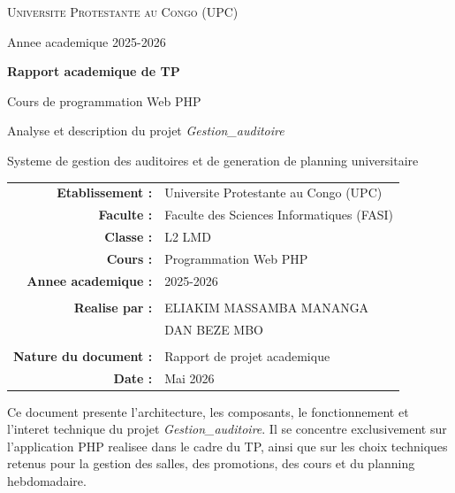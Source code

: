 \documentclass[12pt,a4paper]{article}
\begin{document}
\begin{titlepage}
    \centering
    {\scshape\Large Universite Protestante au Congo (UPC)\par}
    \vspace{0.5cm}
    {\large Annee academique 2025-2026\par}
    \vspace{1.5cm}
    {\huge\bfseries Rapport academique de TP\par}
    \vspace{1cm}
    {\Large Cours de programmation Web PHP\par}
    \vspace{0.7cm}
    {\Large Analyse et description du projet \textit{Gestion\_auditoire}\par}
    \vspace{0.5cm}
    {\large Systeme de gestion des auditoires et de generation de planning universitaire\par}
    \vspace{2cm}

    \begin{tabular}{rl}
        \textbf{Etablissement :} & Universite Protestante au Congo (UPC) \\
        \textbf{Faculte :} & Faculte des Sciences Informatiques (FASI) \\
        \textbf{Classe :} & L2 LMD \\
        \textbf{Cours :} & Programmation Web PHP \\
        \textbf{Annee academique :} & 2025-2026 \\
        \\
        \textbf{Realise par :} & ELIAKIM MASSAMBA MANANGA \\
                               & DAN BEZE MBO \\
        \\
        \textbf{Nature du document :} & Rapport de projet academique \\
        \textbf{Date :} & Mai 2026 \\
    \end{tabular}

    \vfill

    \begin{minipage}{0.9\textwidth}
        \centering
        Ce document presente l'architecture, les composants, le fonctionnement et l'interet technique du projet \textit{Gestion\_auditoire}. Il se concentre exclusivement sur l'application PHP realisee dans le cadre du TP, ainsi que sur les choix techniques retenus pour la gestion des salles, des promotions, des cours et du planning hebdomadaire.
    \end{minipage}

    \vfill
\end{titlepage}
\end{document}

